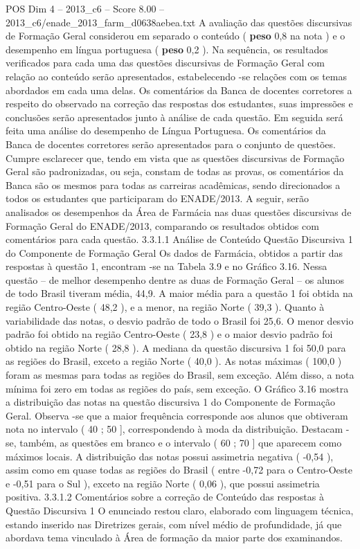 \begin{textsample}{POS Dim 4 – 2013\_c6 – Score 8.00 – 2013\_c6/enade\_2013\_farm\_d0638aebea.txt}
A avaliação das questões discursivas de Formação Geral considerou em separado o conteúdo ( \textbf{peso} 0,8 na nota ) e o desempenho em língua portuguesa ( \textbf{peso} 0,2 ).
Na sequência, os resultados verificados para cada uma das questões discursivas de Formação Geral com relação ao conteúdo serão apresentados, estabelecendo -se relações com os temas abordados em cada uma delas.
Os comentários da Banca de docentes corretores a respeito do observado na correção das respostas dos estudantes, suas impressões e conclusões serão apresentados junto à análise de cada questão.
Em seguida será feita uma análise do desempenho de Língua Portuguesa.
Os comentários da Banca de docentes corretores serão apresentados para o conjunto de questões.
Cumpre esclarecer que, tendo em vista que as questões discursivas de Formação Geral são padronizadas, ou seja, constam de todas as provas, os comentários da Banca são os mesmos para todas as carreiras acadêmicas, sendo direcionados a todos os estudantes que participaram do ENADE/2013.
A seguir, serão analisados os desempenhos da Área de Farmácia nas duas questões discursivas de Formação Geral do ENADE/2013, comparando os resultados obtidos com comentários para cada questão. 3.3.1.1 Análise de Conteúdo Questão Discursiva 1 do Componente de Formação Geral Os dados de Farmácia, obtidos a partir das respostas à questão 1, encontram -se na Tabela 3.9 e no Gráfico 3.16.
Nessa questão – de melhor desempenho dentre as duas de Formação Geral – os alunos de todo Brasil tiveram média, 44,9.
A maior média para a questão 1 foi obtida na região Centro-Oeste ( 48,2 ), e a menor, na região Norte ( 39,3 ).
Quanto à variabilidade das notas, o desvio padrão de todo o Brasil foi 25,6.
O menor desvio padrão foi obtido na região Centro-Oeste ( 23,8 ) e o maior desvio padrão foi obtido na região Norte ( 28,8 ).
A mediana da questão discursiva 1 foi 50,0 para as regiões do Brasil, exceto a região Norte ( 40,0 ).
As notas máximas ( 100,0 ) foram as mesmas para todas as regiões do Brasil, sem exceção.
Além disso, a nota mínima foi zero em todas as regiões do país, sem exceção.
O Gráfico 3.16 mostra a distribuição das notas na questão discursiva 1 do Componente de Formação Geral.
Observa -se que a maior frequência corresponde aos alunos que obtiveram nota no intervalo ( 40 ; 50 ], correspondendo à moda da distribuição.
Destacam -se, também, as questões em branco e o intervalo ( 60 ; 70 ] que aparecem como máximos locais.
A distribuição das notas possui assimetria negativa ( -0,54 ), assim como em quase todas as regiões do Brasil ( entre -0,72 para o Centro-Oeste e -0,51 para o Sul ), exceto na região Norte ( 0,06 ), que possui assimetria positiva. 3.3.1.2 Comentários sobre a correção de Conteúdo das respostas à Questão Discursiva 1 O enunciado restou claro, elaborado com linguagem técnica, estando inserido nas Diretrizes gerais, com nível médio de profundidade, já que abordava tema vinculado à Área de formação da maior parte dos examinandos.

\end{textsample}
